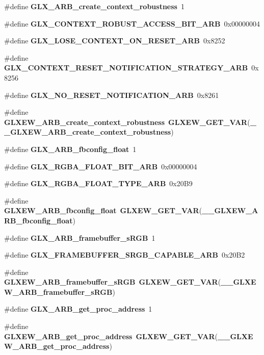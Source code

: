\begin{DoxyCompactItemize}
\#define {\bf G\+L\+X\+\_\+\+A\+R\+B\+\_\+create\+\_\+context\+\_\+robustness}~1
\item 
\#define {\bf G\+L\+X\+\_\+\+C\+O\+N\+T\+E\+X\+T\+\_\+\+R\+O\+B\+U\+S\+T\+\_\+\+A\+C\+C\+E\+S\+S\+\_\+\+B\+I\+T\+\_\+\+A\+RB}~0x00000004
\item 
\#define {\bf G\+L\+X\+\_\+\+L\+O\+S\+E\+\_\+\+C\+O\+N\+T\+E\+X\+T\+\_\+\+O\+N\+\_\+\+R\+E\+S\+E\+T\+\_\+\+A\+RB}~0x8252
\item 
\#define {\bf G\+L\+X\+\_\+\+C\+O\+N\+T\+E\+X\+T\+\_\+\+R\+E\+S\+E\+T\+\_\+\+N\+O\+T\+I\+F\+I\+C\+A\+T\+I\+O\+N\+\_\+\+S\+T\+R\+A\+T\+E\+G\+Y\+\_\+\+A\+RB}~0x8256
\item 
\#define {\bf G\+L\+X\+\_\+\+N\+O\+\_\+\+R\+E\+S\+E\+T\+\_\+\+N\+O\+T\+I\+F\+I\+C\+A\+T\+I\+O\+N\+\_\+\+A\+RB}~0x8261
\item 
\#define {\bf G\+L\+X\+E\+W\+\_\+\+A\+R\+B\+\_\+create\+\_\+context\+\_\+robustness}~{\bf G\+L\+X\+E\+W\+\_\+\+G\+E\+T\+\_\+\+V\+AR}({\bf \+\_\+\+\_\+\+G\+L\+X\+E\+W\+\_\+\+A\+R\+B\+\_\+create\+\_\+context\+\_\+robustness})
\item 
\#define {\bf G\+L\+X\+\_\+\+A\+R\+B\+\_\+fbconfig\+\_\+float}~1
\item 
\#define {\bf G\+L\+X\+\_\+\+R\+G\+B\+A\+\_\+\+F\+L\+O\+A\+T\+\_\+\+B\+I\+T\+\_\+\+A\+RB}~0x00000004
\item 
\#define {\bf G\+L\+X\+\_\+\+R\+G\+B\+A\+\_\+\+F\+L\+O\+A\+T\+\_\+\+T\+Y\+P\+E\+\_\+\+A\+RB}~0x20\+B9
\item 
\#define {\bf G\+L\+X\+E\+W\+\_\+\+A\+R\+B\+\_\+fbconfig\+\_\+float}~{\bf G\+L\+X\+E\+W\+\_\+\+G\+E\+T\+\_\+\+V\+AR}({\bf \+\_\+\+\_\+\+G\+L\+X\+E\+W\+\_\+\+A\+R\+B\+\_\+fbconfig\+\_\+float})
\item 
\#define {\bf G\+L\+X\+\_\+\+A\+R\+B\+\_\+framebuffer\+\_\+s\+R\+GB}~1
\item 
\#define {\bf G\+L\+X\+\_\+\+F\+R\+A\+M\+E\+B\+U\+F\+F\+E\+R\+\_\+\+S\+R\+G\+B\+\_\+\+C\+A\+P\+A\+B\+L\+E\+\_\+\+A\+RB}~0x20\+B2
\item 
\#define {\bf G\+L\+X\+E\+W\+\_\+\+A\+R\+B\+\_\+framebuffer\+\_\+s\+R\+GB}~{\bf G\+L\+X\+E\+W\+\_\+\+G\+E\+T\+\_\+\+V\+AR}({\bf \+\_\+\+\_\+\+G\+L\+X\+E\+W\+\_\+\+A\+R\+B\+\_\+framebuffer\+\_\+s\+R\+GB})
\item 
\#define {\bf G\+L\+X\+\_\+\+A\+R\+B\+\_\+get\+\_\+proc\+\_\+address}~1
\item 
\#define {\bf G\+L\+X\+E\+W\+\_\+\+A\+R\+B\+\_\+get\+\_\+proc\+\_\+address}~{\bf G\+L\+X\+E\+W\+\_\+\+G\+E\+T\+\_\+\+V\+AR}({\bf \+\_\+\+\_\+\+G\+L\+X\+E\+W\+\_\+\+A\+R\+B\+\_\+get\+\_\+proc\+\_\+address})

\end{DoxyCompactItemize}
